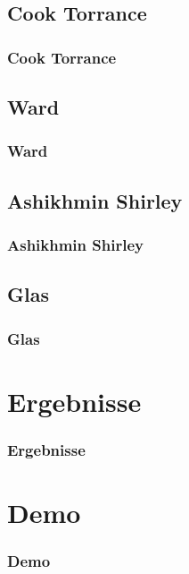 \documentclass[11pt]{beamer}
\begin{document}
\subsection{Cook Torrance}
\begin{frame}
\frametitle{Cook Torrance}
\end{frame}

\subsection{Ward}
\begin{frame}
\frametitle{Ward}
\end{frame}

\subsection{Ashikhmin Shirley}
\begin{frame}
\frametitle{Ashikhmin Shirley}
\end{frame}

\subsection{Glas}
\begin{frame}
\frametitle{Glas}
\end{frame}

\section{Ergebnisse}
\begin{frame}
\frametitle{Ergebnisse}
\end{frame}

\section{Demo}
\begin{frame}
\frametitle{Demo}
\end{frame}
\end{document}
